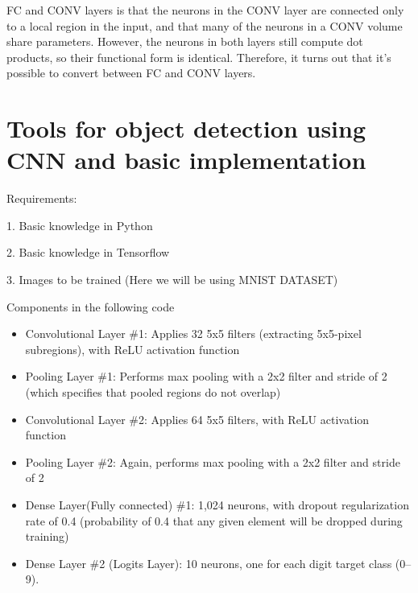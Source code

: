 \documentclass[12pt]{article}
\begin{document}
 FC and CONV layers is that the neurons in the CONV layer are connected only to a local region in the input, and that many of the neurons in a CONV volume share parameters. However, the neurons in both layers still compute dot products, so their functional form is identical. Therefore, it turns out that it’s possible to convert between FC and CONV layers.
\section{\fontsize{14}{14}\selectfont Tools for object detection using CNN and basic implementation}
Requirements:


1. Basic knowledge in Python

2. Basic knowledge in Tensorflow

3. Images to be trained (Here we will be using MNIST DATASET)

Components in the following code

\begin{itemize}

   \item Convolutional Layer \#1: Applies 32 5x5 filters (extracting 5x5-pixel subregions), with ReLU activation function
   \item Pooling Layer \#1: Performs max pooling with a 2x2 filter and stride of 2 (which specifies that pooled regions do not overlap)
   \item Convolutional Layer \#2: Applies 64 5x5 filters, with ReLU activation function
   \item Pooling Layer \#2: Again, performs max pooling with a 2x2 filter and stride of 2
   \item Dense Layer(Fully connected) \#1: 1,024 neurons, with dropout regularization rate of 0.4 (probability of 0.4 that any given element will be dropped during training)
    \item Dense Layer \#2 (Logits Layer): 10 neurons, one for each digit target class (0–9).
    
\end{itemize}
\end{document}
